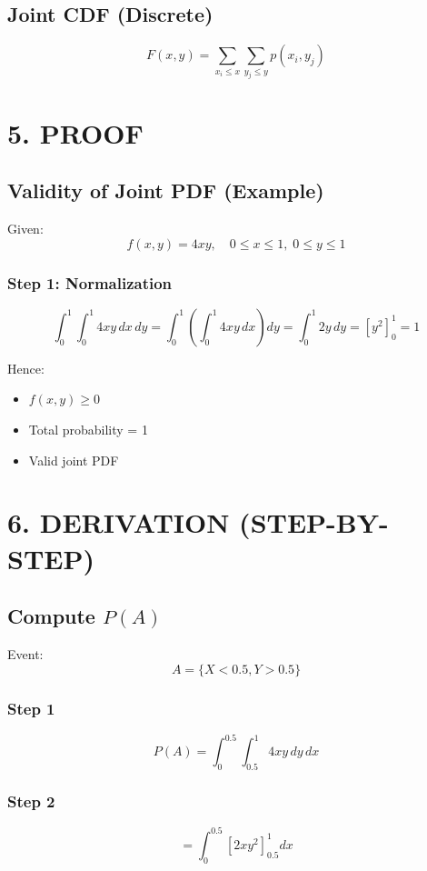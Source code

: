 \documentclass[12pt]{article}
\begin{document}
\subsection*{Joint CDF (Discrete)}
\[
F(x,y) = \sum_{x_i \le x} \sum_{y_j \le y} p(x_i,y_j)
\]

\section*{5. PROOF}

\subsection*{Validity of Joint PDF (Example)}

Given:
\[
f(x,y) = 4xy, \quad 0 \le x \le 1,\; 0 \le y \le 1
\]

\subsubsection*{Step 1: Normalization}
\[
\int_0^1 \int_0^1 4xy\,dx\,dy
= \int_0^1 \left( \int_0^1 4xy\,dx \right) dy
= \int_0^1 2y\,dy
= [y^2]_0^1 = 1
\]

Hence:
\begin{itemize}
\item $f(x,y) \ge 0$
\item Total probability = 1
\item Valid joint PDF
\end{itemize}

\section*{6. DERIVATION (STEP-BY-STEP)}

\subsection*{Compute $P(A)$}

Event:
\[
A = \{X < 0.5, Y > 0.5\}
\]

\subsubsection*{Step 1}
\[
P(A) = \int_0^{0.5} \int_{0.5}^{1} 4xy\,dy\,dx
\]

\subsubsection*{Step 2}
\[
= \int_0^{0.5} \left[ 2x y^2 \right]_{0.5}^{1} dx
\]
\end{document}
